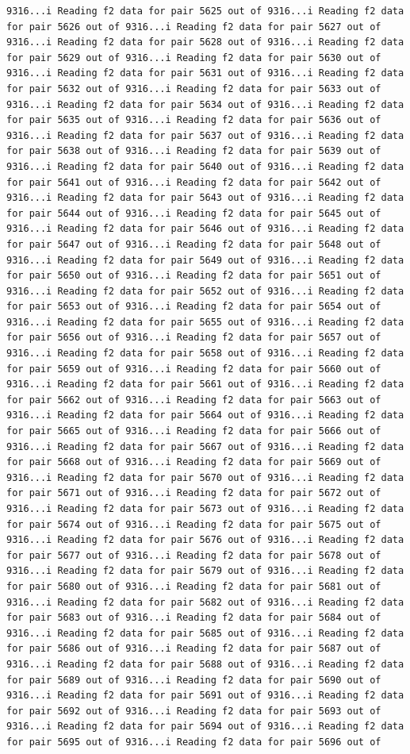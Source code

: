 \documentclass[
]{article}
\begin{document}
\begin{verbatim}
9316...i Reading f2 data for pair 5625 out of 9316...i Reading f2 data for pair 5626 out of 9316...i Reading f2 data for pair 5627 out of 9316...i Reading f2 data for pair 5628 out of 9316...i Reading f2 data for pair 5629 out of 9316...i Reading f2 data for pair 5630 out of 9316...i Reading f2 data for pair 5631 out of 9316...i Reading f2 data for pair 5632 out of 9316...i Reading f2 data for pair 5633 out of 9316...i Reading f2 data for pair 5634 out of 9316...i Reading f2 data for pair 5635 out of 9316...i Reading f2 data for pair 5636 out of 9316...i Reading f2 data for pair 5637 out of 9316...i Reading f2 data for pair 5638 out of 9316...i Reading f2 data for pair 5639 out of 9316...i Reading f2 data for pair 5640 out of 9316...i Reading f2 data for pair 5641 out of 9316...i Reading f2 data for pair 5642 out of 9316...i Reading f2 data for pair 5643 out of 9316...i Reading f2 data for pair 5644 out of 9316...i Reading f2 data for pair 5645 out of 9316...i Reading f2 data for pair 5646 out of 9316...i Reading f2 data for pair 5647 out of 9316...i Reading f2 data for pair 5648 out of 9316...i Reading f2 data for pair 5649 out of 9316...i Reading f2 data for pair 5650 out of 9316...i Reading f2 data for pair 5651 out of 9316...i Reading f2 data for pair 5652 out of 9316...i Reading f2 data for pair 5653 out of 9316...i Reading f2 data for pair 5654 out of 9316...i Reading f2 data for pair 5655 out of 9316...i Reading f2 data for pair 5656 out of 9316...i Reading f2 data for pair 5657 out of 9316...i Reading f2 data for pair 5658 out of 9316...i Reading f2 data for pair 5659 out of 9316...i Reading f2 data for pair 5660 out of 9316...i Reading f2 data for pair 5661 out of 9316...i Reading f2 data for pair 5662 out of 9316...i Reading f2 data for pair 5663 out of 9316...i Reading f2 data for pair 5664 out of 9316...i Reading f2 data for pair 5665 out of 9316...i Reading f2 data for pair 5666 out of 9316...i Reading f2 data for pair 5667 out of 9316...i Reading f2 data for pair 5668 out of 9316...i Reading f2 data for pair 5669 out of 9316...i Reading f2 data for pair 5670 out of 9316...i Reading f2 data for pair 5671 out of 9316...i Reading f2 data for pair 5672 out of 9316...i Reading f2 data for pair 5673 out of 9316...i Reading f2 data for pair 5674 out of 9316...i Reading f2 data for pair 5675 out of 9316...i Reading f2 data for pair 5676 out of 9316...i Reading f2 data for pair 5677 out of 9316...i Reading f2 data for pair 5678 out of 9316...i Reading f2 data for pair 5679 out of 9316...i Reading f2 data for pair 5680 out of 9316...i Reading f2 data for pair 5681 out of 9316...i Reading f2 data for pair 5682 out of 9316...i Reading f2 data for pair 5683 out of 9316...i Reading f2 data for pair 5684 out of 9316...i Reading f2 data for pair 5685 out of 9316...i Reading f2 data for pair 5686 out of 9316...i Reading f2 data for pair 5687 out of 9316...i Reading f2 data for pair 5688 out of 9316...i Reading f2 data for pair 5689 out of 9316...i Reading f2 data for pair 5690 out of 9316...i Reading f2 data for pair 5691 out of 9316...i Reading f2 data for pair 5692 out of 9316...i Reading f2 data for pair 5693 out of 9316...i Reading f2 data for pair 5694 out of 9316...i Reading f2 data for pair 5695 out of 9316...i Reading f2 data for pair 5696 out of 
\end{verbatim}
\end{document}
